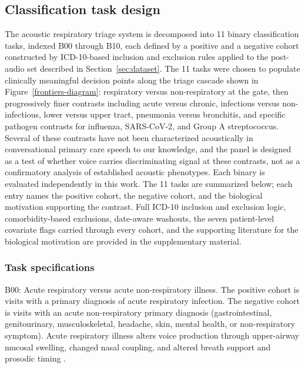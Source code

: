 \documentclass[utf8]{FrontiersinHarvard} %
\begin{document}
\subsection{Classification task design}
\label{sec:cohort-design}

The acoustic respiratory triage system is decomposed into 11 binary classification tasks, indexed B00 through B10, each defined by a positive and a negative cohort constructed by ICD-10-based inclusion and exclusion rules applied to the post-audio set described in Section~\ref{sec:dataset}. The 11 tasks were chosen to populate clinically meaningful decision points along the triage cascade shown in Figure~\ref{frontiers-diagram}: respiratory versus non-respiratory at the gate, then progressively finer contrasts including acute versus chronic, infectious versus non-infectious, lower versus upper tract, pneumonia versus bronchitis, and specific pathogen contrasts for influenza, SARS-CoV-2, and Group A streptococcus. Several of these contrasts have not been characterized acoustically in conversational primary care speech to our knowledge, and the panel is designed as a test of whether voice carries discriminating signal at these contrasts, not as a confirmatory analysis of established acoustic phenotypes. Each binary is evaluated independently in this work. The 11 tasks are summarized below; each entry names the positive cohort, the negative cohort, and the biological motivation supporting the contrast. Full ICD-10 inclusion and exclusion logic, comorbidity-based exclusions, date-aware washouts, the seven patient-level covariate flags carried through every cohort, and the supporting literature for the biological motivation are provided in the supplementary material.

\subsubsection{Task specifications}
\label{sec:task-specifications}

B00: Acute respiratory versus acute non-respiratory illness. The positive cohort is visits with a primary diagnosis of acute respiratory infection. The negative cohort is visits with an acute non-respiratory primary diagnosis (gastrointestinal, genitourinary, musculoskeletal, headache, skin, mental health, or non-respiratory symptom). Acute respiratory illness alters voice production through upper-airway mucosal swelling, changed nasal coupling, and altered breath support and prosodic timing \citep{voice-acoustics-acute-resp-mechanisms,nasal-coupling-spectral,pharyngitis-laryngitis-dysphonia,lri-breath-support-prosody}.
\end{document}
